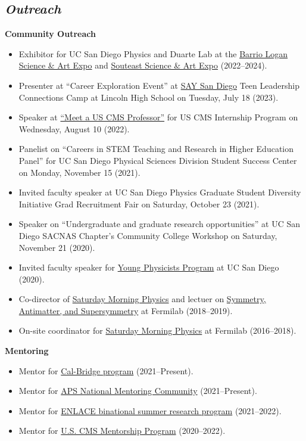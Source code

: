 \documentclass[11pt]{res}
\newcommand{\MarginText}[1]{\section{\textit{#1}}}
\begin{document}
\begin{resume}
  \MarginText{Outreach}
  \textbf{Community Outreach}
  \begin{itemize}
    \itemsep-0.3em
    \item Exhibitor for UC San Diego Physics and Duarte Lab at the \href{https://www.barriologansae.com/}{Barrio Logan Science \& Art Expo} and \href{https://www.southeastsdsteamexpo.com/}{Souteast Science \& Art Expo} ({2022--2024}).
    \item Presenter at ``Career Exploration Event'' at \href{https://saysandiego.org}{SAY San Diego} Teen Leadership Connections Camp at Lincoln High School on Tuesday, July 18 (2023).
    \item Speaker at \href{https://indico.cern.ch/event/1167965/timetable/#93-meet-a-uscms-professorscien}{``Meet a US CMS Professor''} for US CMS Internship Program on Wednesday, August 10 (2022).
    \item Panelist on ``Careers in STEM Teaching and Research in Higher Education Panel'' for UC San Diego Physical Sciences Division Student Success Center on Monday, November 15 ({2021}).
    \item Invited faculty speaker at UC San Diego Physics Graduate Student Diversity Initiative Grad Recruitment Fair on Saturday, October 23 ({2021}).
    \item Speaker on ``Undergraduate and graduate research opportunities'' at UC San Diego SACNAS Chapter's Community College Workshop on Saturday, November 21 ({2020}).
    \item Invited faculty speaker for \href{http://ypp.ucsd.edu/}{Young Physicists Program} at UC San Diego ({2020}).
    \item Co-director of \href{http://saturdaymorningphysics.fnal.gov/}{Saturday Morning Physics} and lectuer on \href{http://saturdaymorningphysics.fnal.gov/fall-session-2018/}{Symmetry, Antimatter, and Supersymmetry} at Fermilab ({2018--2019}).
    \item On-site coordinator for \href{http://saturdaymorningphysics.fnal.gov/}{Saturday Morning Physics} at Fermilab ({2016--2018}).
  \end{itemize}

  \textbf{Mentoring}
  \begin{itemize}
    \itemsep-0.3em
    \item Mentor for \href{https://www.cpp.edu/calbridge/index.shtml}{Cal-Bridge program} ({2021--Present}).
    \item Mentor for \href{https://aps.org/programs/minorities/nmc/}{APS National Mentoring Community} (2021--Present).
    \item Mentor for \href{http://resilientmaterials.ucsd.edu/ENLACE}{ENLACE binational summer research program} ({2021--2022}).
    \item Mentor for \href{https://uscms-diversity-equity-inclusion.github.io/mentorship.html}{U.S. CMS Mentorship Program} ({2020--2022}).
  \end{itemize}


\end{resume}
\end{document}
